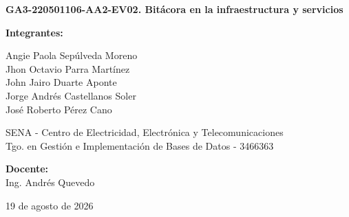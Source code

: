 	\begin{titlepage}
		\centering
		
		
		{\Large\bfseries GA3-220501106-AA2-EV02. Bitácora en la infraestructura y servicios \par} %
		
		\vspace{5.5cm} %
		
		{\large \textbf{Integrantes:} \par}
		\vspace{0.3cm}
		Angie Paola Sepúlveda Moreno \\
		Jhon Octavio Parra Martínez \\
		John Jairo Duarte Aponte \\
		Jorge Andrés Castellanos Soler \\
		José Roberto Pérez Cano \\
		
		\vfill %
		
		SENA - Centro de Electricidad, Electrónica y Telecomunicaciones \\
		Tgo. en Gestión e Implementación de Bases de Datos - 3466363 \\
		
		\vspace{1cm}
		
		\textbf{Docente:} \\
		Ing. Andrés Quevedo \\
		
		\vspace{1.5cm}
		
		19 de agosto de 2026 \par
		
	\end{titlepage}
